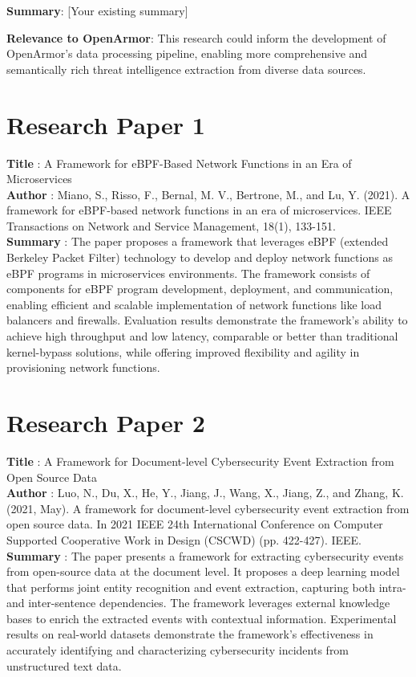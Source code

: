 \textbf{Summary}: [Your existing summary]

\textbf{Relevance to OpenArmor}: This research could inform the development of OpenArmor's data processing pipeline, enabling more comprehensive and semantically rich threat intelligence extraction from diverse data sources.


\section{Research Paper 1}
\textbf{Title }: A Framework for eBPF-Based Network Functions in an Era of Microservices 
\\
\textbf{Author }: Miano, S., Risso, F., Bernal, M. V., Bertrone, M., and Lu, Y. (2021). A framework for eBPF-based network functions in an era of microservices. IEEE Transactions on Network and Service Management, 18(1), 133-151.
\\
\textbf{Summary }: The paper proposes a framework that leverages eBPF (extended Berkeley Packet Filter) technology to develop and deploy network functions as eBPF programs in microservices environments. The framework consists of components for eBPF program development, deployment, and communication, enabling efficient and scalable implementation of network functions like load balancers and firewalls. Evaluation results demonstrate the framework's ability to achieve high throughput and low latency, comparable or better than traditional kernel-bypass solutions, while offering improved flexibility and agility in provisioning network functions.

\section{Research Paper 2}
\textbf{Title} : A Framework for Document-level Cybersecurity Event Extraction from Open Source Data
\\
\textbf{Author} : Luo, N., Du, X., He, Y., Jiang, J., Wang, X., Jiang, Z., and Zhang, K. (2021, May). A framework for document-level cybersecurity event extraction from open source data. In 2021 IEEE 24th International Conference on Computer Supported Cooperative Work in Design (CSCWD) (pp. 422-427). IEEE.
\\
\newpage
\textbf{Summary} : The paper presents a framework for extracting cybersecurity events from open-source data at the document level. It proposes a deep learning model that performs joint entity recognition and event extraction, capturing both intra- and inter-sentence dependencies. The framework leverages external knowledge bases to enrich the extracted events with contextual information. Experimental results on real-world datasets demonstrate the framework's effectiveness in accurately identifying and characterizing cybersecurity incidents from unstructured text data.

